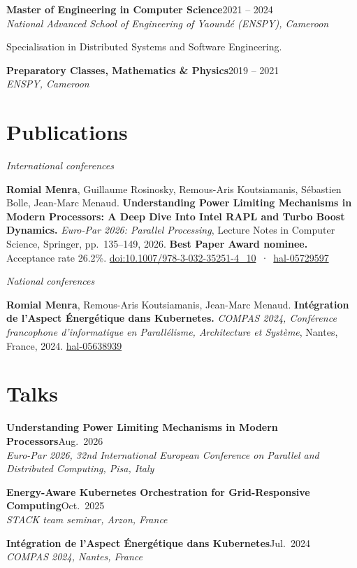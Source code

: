 \documentclass[10pt,a4paper]{article}
\newcommand{\entry}[3]{%
  \textbf{#1}\hfill{\color{muted}#2}\\
  {\color{muted}\itshape #3}\par\vspace{0.2ex}}
\newcommand{\pub}[2]{%
  \par\hangindent=0.9cm\hangafter=1\noindent
  \makebox[0.9cm][l]{\color{accent}\bfseries #1}#2\par\vspace{0.8ex}}
\newcommand{\me}{\textbf{Romial Menra}}
\newcommand{\link}[2]{\href{#1}{{\color{accent}#2}}}
\begin{document}
\entry{Master of Engineering in Computer Science}{2021 -- 2024}{National Advanced School of Engineering of Yaoundé (ENSPY), Cameroon}
Specialisation in Distributed Systems and Software Engineering.
\vspace{1ex}

\entry{Preparatory Classes, Mathematics \& Physics}{2019 -- 2021}{ENSPY, Cameroon}

\section{Publications}
\textit{International conferences}\par\vspace{0.6ex}
\pub{[C2]}{\me, Guillaume Rosinosky, Remous-Aris Koutsiamanis, Sébastien Bolle, Jean-Marc Menaud.
  \textbf{Understanding Power Limiting Mechanisms in Modern Processors: A Deep Dive Into Intel
  RAPL and Turbo Boost Dynamics.} \emph{Euro-Par 2026: Parallel Processing}, Lecture Notes in
  Computer Science, Springer, pp.\ 135--149, 2026.
  {\color{accent}\bfseries Best Paper Award nominee.} Acceptance rate 26.2\%.\newline
  \link{https://doi.org/10.1007/978-3-032-35251-4_10}{doi:10.1007/978-3-032-35251-4\_10}
  \,·\, \link{https://hal.science/hal-05729597}{hal-05729597}}

\textit{National conferences}\par\vspace{0.6ex}
\pub{[N1]}{\me, Remous-Aris Koutsiamanis, Jean-Marc Menaud.
  \textbf{Intégration de l'Aspect Énergétique dans Kubernetes.} \emph{COMPAS 2024, Conférence
  francophone d'informatique en Parallélisme, Architecture et Système}, Nantes, France, 2024.\newline
  \link{https://hal.science/hal-05638939}{hal-05638939}}

\section{Talks}
\entry{Understanding Power Limiting Mechanisms in Modern Processors}{Aug.\ 2026}{Euro-Par 2026, 32nd International European Conference on Parallel and Distributed Computing, Pisa, Italy}
\vspace{0.6ex}
\entry{Energy-Aware Kubernetes Orchestration for Grid-Responsive Computing}{Oct.\ 2025}{STACK team seminar, Arzon, France}
\vspace{0.6ex}
\entry{Intégration de l'Aspect Énergétique dans Kubernetes}{Jul.\ 2024}{COMPAS 2024, Nantes, France}
\end{document}
